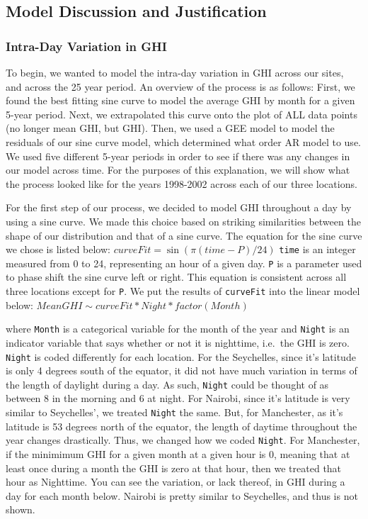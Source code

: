 \documentclass[
  letterpaper,
  DIV=11,
  numbers=noendperiod]{scrartcl}
\begin{document}
\hypertarget{model-discussion-and-justification}{%
\subsection{Model Discussion and
Justification}\label{model-discussion-and-justification}}

\hypertarget{intra-day-variation-in-ghi}{%
\subsubsection{Intra-Day Variation in
GHI}\label{intra-day-variation-in-ghi}}

To begin, we wanted to model the intra-day variation in GHI across our
sites, and across the 25 year period. An overview of the process is as
follows: First, we found the best fitting sine curve to model the
average GHI by month for a given 5-year period. Next, we extrapolated
this curve onto the plot of ALL data points (no longer mean GHI, but
GHI). Then, we used a GEE model to model the residuals of our sine curve
model, which determined what order AR model to use. We used five
different 5-year periods in order to see if there was any changes in our
model across time. For the purposes of this explanation, we will show
what the process looked like for the years 1998-2002 across each of our
three locations.

For the first step of our process, we decided to model GHI throughout a
day by using a sine curve. We made this choice based on striking
similarities between the shape of our distribution and that of a sine
curve. The equation for the sine curve we chose is listed below:
\(curveFit = \sin(\pi(time - P)/24)\) \texttt{time} is an integer
measured from 0 to 24, representing an hour of a given day. \texttt{P}
is a parameter used to phase shift the sine curve left or right. This
equation is consistent across all three locations except for \texttt{P}.
We put the results of \texttt{curveFit} into the linear model below:
\(MeanGHI \sim curveFit*Night*factor(Month)\)

where \texttt{Month} is a categorical variable for the month of the year
and \texttt{Night} is an indicator variable that says whether or not it
is nighttime, i.e.~the GHI is zero. \texttt{Night} is coded differently
for each location. For the Seychelles, since it's latitude is only 4
degrees south of the equator, it did not have much variation in terms of
the length of daylight during a day. As such, \texttt{Night} could be
thought of as between 8 in the morning and 6 at night. For Nairobi,
since it's latitude is very similar to Seychelles', we treated
\texttt{Night} the same. But, for Manchester, as it's latitude is 53
degrees north of the equator, the length of daytime throughout the year
changes drastically. Thus, we changed how we coded \texttt{Night}. For
Manchester, if the minimimum GHI for a given month at a given hour is 0,
meaning that at least once during a month the GHI is zero at that hour,
then we treated that hour as Nighttime. You can see the variation, or
lack thereof, in GHI during a day for each month below. Nairobi is
pretty similar to Seychelles, and thus is not shown.
\end{document}
